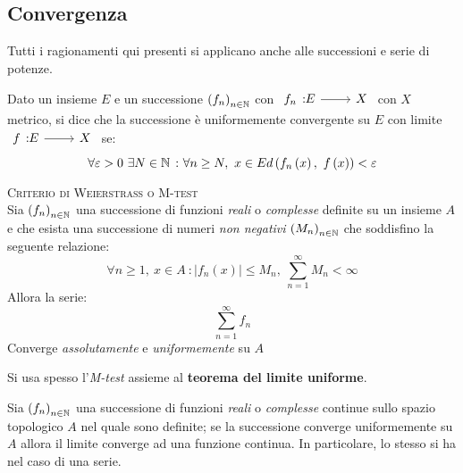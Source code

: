 \subsection{Convergenza}\label{convergenzauniforme}
Tutti i ragionamenti qui presenti si applicano anche alle successioni e serie di potenze.
\begin{define}
	Dato un insieme $E$ e un successione $\left(f_n\right)_{n\in\mathbb{N}}$ con $\funz{f_n}{E}{X}$ con $X$ metrico, si dice che la successione è uniformemente convergente  su $E$ con limite $\funz{f}{E}{X}$ se:
	\begin{equation}
		\forall\epsilon>0\ \exists N\in\naturalset\ \colon \forall n\geq N,\ x\in E \mvf{d}{f_n\left(x\right)}{f\left(x\right)}<\epsilon
	\end{equation}
\vspace{-6mm}
\end{define}
\begin{define}\textsc{Criterio di Weierstrass o M-test}\\
	Sia $\left(f_n\right)_{n\in\mathbb{N}}$ una successione di funzioni \textit{reali} o \textit{complesse} definite su un insieme $A$ e che esista una successione di numeri \textit{non negativi} $\left(M_n\right)_{n\in\mathbb{N}}$ che soddisfino la seguente relazione:
	\begin{equation}
		\forall n\geq 1,\ x\in A\ \colon \lvert f_n\left(x\right)\rvert \leq M_n,\ \sum_{n=1}^{\infty}M_n<\infty
	\end{equation}
Allora la serie:
\begin{equation}
	\sum_{n=1}^{\infty}f_n
\end{equation}
Converge \textit{assolutamente} e \textit{uniformemente} su $A$
\end{define}
Si usa spesso l'\textit{M-test} assieme al \textbf{teorema del limite uniforme}.
\begin{define}
Sia $\left(f_n\right)_{n\in\mathbb{N}}$ una successione di funzioni \textit{reali} o \textit{complesse} continue sullo spazio topologico $A$ nel quale sono definite; se la successione converge uniformemente su $A$ allora il limite converge ad una funzione continua. In particolare, lo stesso si ha nel caso di una serie.
\end{define}
